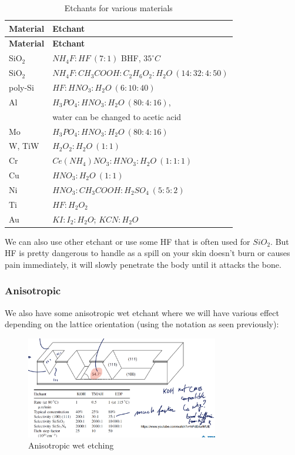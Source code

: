 \documentclass[
]{article}
\begin{document}
\begin{longtable}[]{@{}ll@{}}
\caption{Etchants for various materials}\tabularnewline
\toprule\noalign{}
\textbf{Material} & \textbf{Etchant} \\
\midrule\noalign{}
\endfirsthead
\toprule\noalign{}
\textbf{Material} & \textbf{Etchant} \\
\midrule\noalign{}
\endhead
\bottomrule\noalign{}
\endlastfoot
SiO\(_2\) & \(NH_4F:HF \ (7:1)\) BHF, \(35^\circ C\) \\
SiO\(_2\) & \({NH_4F:CH_3COOH:C_2H_6O_2:H_2O} \ (14:32:4:50)\) \\
poly-Si & \({HF:HNO_3:H_2O} \ (6:10:40)\) \\
Al & \({H_3PO_4:HNO_3:H_2O} \ (80:4:16)\), \\
& water can be changed to acetic acid \\
Mo & \({H_3PO_4:HNO_3:H_2O} \ (80:4:16)\) \\
W, TiW & \({H_2O_2:H_2O} \ (1:1)\) \\
Cr & \({Ce(NH_4)NO_3:HNO_3:H_2O} \ (1:1:1)\) \\
Cu & \({HNO_3:H_2O} \ (1:1)\) \\
Ni & \({HNO_3:CH_3COOH:H_2SO_4} \ (5:5:2)\) \\
Ti & \({HF:H_2O_2}\) \\
Au & \({KI:I_2:H_2O}\); \({KCN:H_2O}\) \\
\end{longtable}

We can also use other etchant or use some HF that is often used for
\(SiO_2\). But HF is pretty dangerous to handle as a spill on your skin
doesn't burn or causes pain immediately, it will slowly penetrate the
body until it attacks the bone.

\hypertarget{anisotropic}{%
\subsubsection{Anisotropic}\label{anisotropic}}

We also have some anisotropic wet etchant where we will have various
effect depending on the lattice orientation (using the notation as seen
previously):

\begin{figure}
\hypertarget{fig:enter-label}{%
\centering
\includegraphics[width=0.75\textwidth,height=\textheight]{ansitropic_wet.png}
\caption{Anisotropic wet etching}\label{fig:enter-label}
}
\end{figure}
\end{document}
